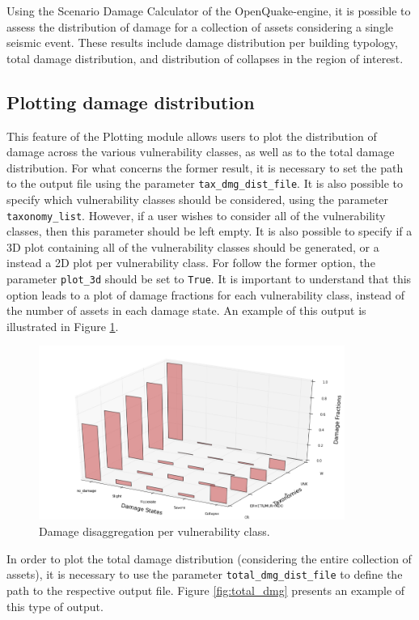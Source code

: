 Using the Scenario Damage Calculator \citep{SilvaEtAl2014a} of the OpenQuake-engine, it is possible to assess the distribution of damage for a collection of assets considering a single seismic event. These results include damage distribution per building typology, total damage distribution, and distribution of collapses in the region of interest.

\subsection{Plotting damage distribution}
\label{subsec:plot-damage_disag}
This feature of the Plotting module allows users to plot the distribution of damage across the various vulnerability classes, as well as to the total damage distribution. For what concerns the former result, it is necessary to set the path to the output file using the parameter \verb=tax_dmg_dist_file=. It is also possible to specify which vulnerability classes should be considered, using the parameter \verb=taxonomy_list=. However, if a user wishes to consider all of the vulnerability classes, then this parameter should be left empty. It is also possible to specify if a 3D plot containing all of the vulnerability classes should be generated, or a instead a 2D plot per vulnerability class. For follow the former option, the parameter \verb=plot_3d= should be set to \verb=True=. It is important to understand that this option leads to a plot of damage fractions for each vulnerability class, instead of the number of assets in each damage state. An example of this output is illustrated in Figure \ref{fig:damage_disag}.

\begin{figure}[htb]
  \centering
      \includegraphics[width=10cm]{figures/damage_distribution.png}
  \caption{Damage disaggregation per vulnerability class.}
  \label{fig:damage_disag}
\end{figure}

In order to plot the total damage distribution (considering the entire collection of assets), it is necessary to use the parameter \verb=total_dmg_dist_file= to define the path to the respective output file. Figure \ref{fig:total_dmg} presents an example of this type of output.


